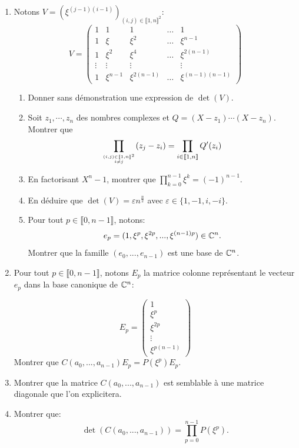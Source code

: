 \begin{enumerate}
 \item Notons $V = (\xi^{(j-1)(i-1)})_{(i, j)\in \llbracket 1, n\rrbracket^{2}}$:
            \[ V  = \begin{pmatrix}
                     1 & 1 & 1 & \hdots & 1\\
                     1 & \xi & \xi^{2} & \hdots & \xi^{n-1}\\
                     1 & \xi^{2} & \xi^{4} & \hdots & \xi^{2(n-1)}\\
                     \vdots & \vdots & \vdots & & \vdots \\
                     1 & \xi^{n-1} & \xi^{2(n-1)} & \hdots & \xi^{(n-1)(n-1)}
                    \end{pmatrix}\]
                    
 \begin{enumerate}
            \item Donner sans démonstration une expression de $\det(V)$.
            \item Soit $z_1, \cdots ,z_n$ des nombres complexes et $Q = (X-z_1) \cdots (X-z_n)$.\newline
Montrer que
\[
  \prod_{(i,j)\in \llbracket 1,n \rrbracket^{2} \atop i \neq j}(z_j - z_i)
  = \prod_{i \in \llbracket 1,n \rrbracket}Q'(z_i)
\]
\item En factorisant $X^{n}-1$, montrer que $\prod_{k=0}^{n-1}\xi^{k} = (-1)^{n-1}$.
\item En déduire que $\det(V) = \varepsilon n^{\frac{n}{2}}$ avec $\varepsilon \in\{ 1, -1, i, -i\}$.

\item Pour tout $p\in \llbracket 0, n-1\rrbracket$, notons:
 \[e_{p} = (1, \xi^{p}, \xi^{2p}, ..., \xi^{(n-1)p})\in \mathbb{C}^{n}. \]
 Montrer que la famille $(e_{0}, ..., e_{n-1})$ est une base de $\mathbb{C}^{n}$.
           \end{enumerate}

\item Pour tout $p\in \llbracket 0, n-1\rrbracket$, notons $E_{p}$ la matrice colonne représentant le vecteur $e_{p}$ dans la base canonique de $\mathbb{C}^{n}$:

 \[ E_{p} = \begin{pmatrix}
             1 \\ \xi^{p} \\ \xi^{2p} \\ \vdots \\ \xi^{p(n-1)}
            \end{pmatrix}\]
Montrer que $C(a_{0}, ..., a_{n-1})E_{p} = P(\xi^{p})E_{p}$.

\item Montrer que la matrice $C(a_{0}, ..., a_{n-1})$ est semblable à une matrice diagonale que l'on explicitera.

\item Montrer que:
\[ \det(C(a_{0}, ..., a_{n-1})) = \prod_{p=0}^{n-1}P(\xi^{p}).\]

\end{enumerate}


